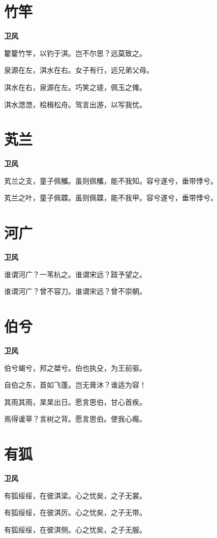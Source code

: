 \documentclass[12pt,a4paper]{ctexbook}
\begin{document}
\section{竹竿}
\textbf{卫风}\par\vspace{0.5em}
籊籊竹竿，以钓于淇。岂不尔思？远莫致之。\par
泉源在左，淇水在右。女子有行，远兄弟父母。\par
淇水在右，泉源在左。巧笑之瑳，佩玉之傩。\par
淇水滺滺，桧楫松舟。驾言出游，以写我忧。\par

\section{芄兰}
\textbf{卫风}\par\vspace{0.5em}
芄兰之支，童子佩觿。虽则佩觿，能不我知。容兮遂兮，垂带悸兮。\par
芄兰之叶，童子佩韘。虽则佩韘，能不我甲。容兮遂兮，垂带悸兮。\par

\section{河广}
\textbf{卫风}\par\vspace{0.5em}
谁谓河广？一苇杭之。谁谓宋远？跂予望之。\par
谁谓河广？曾不容刀。谁谓宋远？曾不崇朝。\par

\section{伯兮}
\textbf{卫风}\par\vspace{0.5em}
伯兮朅兮，邦之桀兮。伯也执殳，为王前驱。\par
自伯之东，首如飞蓬。岂无膏沐？谁适为容！\par
其雨其雨，杲杲出日。愿言思伯，甘心首疾。\par
焉得谖草？言树之背。愿言思伯。使我心痗。\par

\section{有狐}
\textbf{卫风}\par\vspace{0.5em}
有狐绥绥，在彼淇梁。心之忧矣，之子无裳。\par
有狐绥绥，在彼淇厉。心之忧矣，之子无带。\par
有狐绥绥，在彼淇侧。心之忧矣，之子无服。\par
\end{document}
